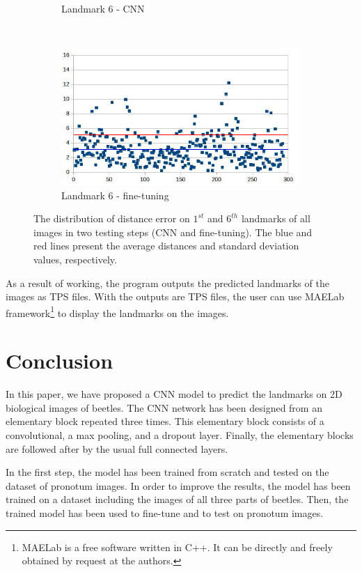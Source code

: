 \documentclass[10pt]{article}
\begin{document}
\begin{figure}[htbp]
\begin{subfigure}[t]{0.25\textwidth}
        \caption{\small{Landmark 6 - CNN}}
        \label{figsub111}
    \end{subfigure}%
    ~ 
    \begin{subfigure}[t]{0.25\textwidth}
        \centering
        \includegraphics[scale=.32]{images/lm6_finetuning_2}
        \caption{\small{Landmark 6 - fine-tuning}}
        \label{figsub222}
    \end{subfigure}
    \caption{\small{The distribution of distance error on $1^{st}$ and $6^{th}$ landmarks of all images in two testing steps (CNN and fine-tuning). The blue and red lines present the average distances and standard deviation values, respectively.}}
    \label{figrsexample2}
\end{figure}

As a result of working, the program outputs the
predicted landmarks of the images as TPS files. With the outputs are TPS files,
the user can use MAELab framework\footnote{MAELab is a free software written in C++. It can be directly and freely
obtained by request at the authors.} to display the
landmarks on the images.
\section{Conclusion}
In this paper, we have proposed a CNN model to predict the landmarks on 2D biological images of beetles. The CNN network has been designed from an elementary block repeated three times. This elementary block consists of a convolutional, a max pooling, and a dropout layer. Finally, the elementary blocks are followed after by the usual full connected layers.

In the first step, the model has been trained from scratch and tested on the dataset of pronotum images. In order to improve the results, the model has been trained on a dataset including the images of all three parts of beetles. Then, the trained model has been used to fine-tune and to test on pronotum images.
\end{document}

